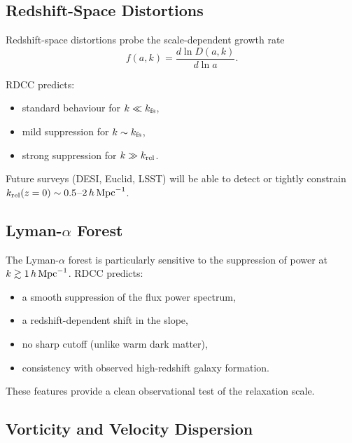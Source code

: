 \documentclass[11pt,a4paper]{article}
\begin{document}
\subsection{Redshift-Space Distortions}

Redshift-space distortions probe the scale-dependent growth rate
\begin{equation}
f(a,k) = \frac{d\ln D(a,k)}{d\ln a}.
\end{equation}

RDCC predicts:
\begin{itemize}
\item standard behaviour for $k \ll k_{\rm fs}$,
\item mild suppression for $k \sim k_{\rm fs}$,
\item strong suppression for $k \gg k_{\rm rel}$.
\end{itemize}

Future surveys (DESI, Euclid, LSST) will be able to detect or tightly constrain
$k_{\rm rel}(z=0) \sim 0.5$–$2\,h\,{\rm Mpc}^{-1}$.

\subsection{Lyman-\texorpdfstring{\(\alpha\)}{alpha} Forest}

The Lyman-$\alpha$ forest is particularly sensitive to the suppression of power at
$k \gtrsim 1\,h\,{\rm Mpc}^{-1}$. RDCC predicts:
\begin{itemize}
\item a smooth suppression of the flux power spectrum,
\item a redshift-dependent shift in the slope,
\item no sharp cutoff (unlike warm dark matter),
\item consistency with observed high-redshift galaxy formation.
\end{itemize}

These features provide a clean observational test of the relaxation scale.

\subsection{Vorticity and Velocity Dispersion}
\end{document}
